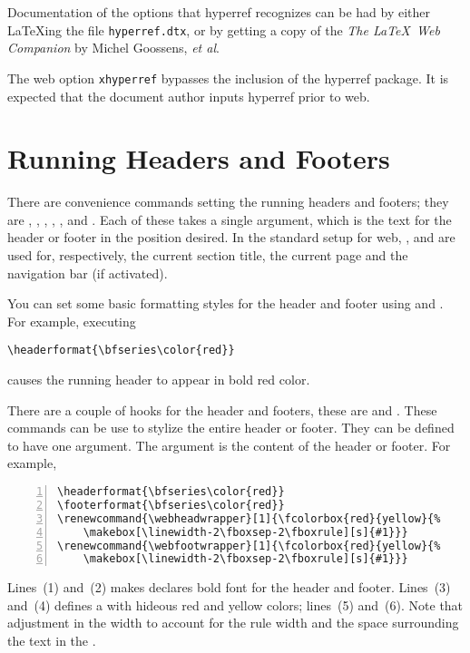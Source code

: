 \documentclass{article}
\renewcommand{\webheadwrapper}[1]{%
    \hspace{-\oddsidemargin}%
    \makebox[\totaltextwidth][s]{#1}\hss
}
\def\Web{\textsf{web}}
\let\pkg\textsf
\edef\amtIndent{\the\parindent}
\begin{document}
{\noindent Documentation of the options that \pkg{hyperref}
recognizes can be had by either \LaTeX ing the file
\texttt{hyperref.dtx}, or by getting a copy of the \textsl{The
\LaTeX\ Web Companion} \cite{book:Goossens3} by Michel Goossens,
{\textsl{et al}}.

\redpoint The \pkg{web} option \texttt{xhyperref} bypasses the inclusion
of the \pkg{hyperref} package. It is expected that the document author inputs
\pkg{hyperref} prior to \pkg{web}.

\section{Running Headers and Footers}

There are convenience commands setting  the running headers and
footers; they are , , ,
, , and . Each of these takes a
single argument, which is the text for the header or footer in the
position desired. In the  standard setup for {\Web}, ,
 and  are used for, respectively, the
current section title, the current page and the navigation bar (if
activated).

You can set some basic formatting styles for the header and footer using
 and . For example, executing
\begin{Verbatim}[xleftmargin=\amtIndent]
\headerformat{\bfseries\color{red}}
\end{Verbatim}
causes the running header to appear in bold red color.

There are a couple of hooks for the header and footers, these are
 and . These commands can be
use to stylize the entire header or footer. They can be defined to have
one argument. The argument is the content of the header or footer. For example,
\begin{Verbatim}[numbers=left,xleftmargin=\amtIndent,fontsize=\small]
\headerformat{\bfseries\color{red}}
\footerformat{\bfseries\color{red}}
\renewcommand{\webheadwrapper}[1]{\fcolorbox{red}{yellow}{%
    \makebox[\linewidth-2\fboxsep-2\fboxrule][s]{#1}}}
\renewcommand{\webfootwrapper}[1]{\fcolorbox{red}{yellow}{%
    \makebox[\linewidth-2\fboxsep-2\fboxrule][s]{#1}}}
\end{Verbatim}
\newtopic Lines~(1) and~(2) makes declares bold font for the header and footer.
Lines~(3) and~(4) defines a  with hideous red and yellow colors;
lines~(5) and~(6). Note that adjustment in the width to account for the 
rule width and the space surrounding the text in the .

}
\end{document}

